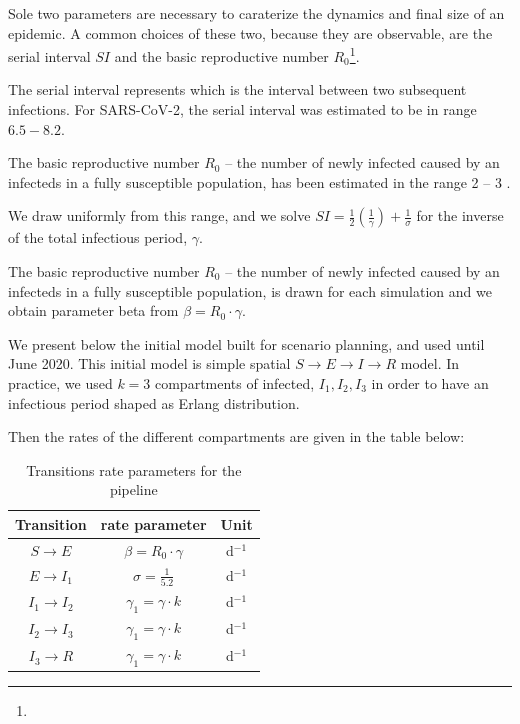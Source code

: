 Sole two parameters are necessary to caraterize the dynamics and final size of an epidemic. A common choices of these two, because they are observable, are the serial interval $SI$ and the basic reproductive number $R_0$\footnote{}.

The serial interval represents which is the interval between two subsequent infections. For SARS-CoV-2, the serial interval was estimated to be in range $6.5-8.2$\cite[][Table S4]{Bi:EpidemiologyTransmissionCOVID19:2020}. 

The basic reproductive number $R_0$ -- the number of newly infected caused by an infecteds in a fully susceptible population, has been estimated in the range 2 -- 3 \cite{Riou:PatternEarlyHumantohuman:2020}.




We draw uniformly from this range, and we solve
$SI = \frac{1}{2}(\frac{1}{\gamma})+\frac{1}{\sigma}$ for the inverse of the total infectious period, $\gamma$.

The basic reproductive number $R_0$ -- the number of newly infected caused by an infecteds in a fully susceptible population, is drawn for each simulation and we obtain parameter beta from
$\beta= R_0 \cdot \gamma$.

We present below the initial model built for scenario planning, and used until June 2020. This initial model is simple spatial $S\longrightarrow E \longrightarrow I \longrightarrow R$ model. In practice, we used $k = 3$ compartments of infected, $I_1, I_2, I_3$ in order to have an infectious period shaped as Erlang distribution.



Then the rates of the different compartments are given in the table below:
\begin{table}
    \centering
    \begin{tabular}{ccc}
\toprule
Transition & rate parameter &Unit \\
 \midrule
$S\longrightarrow E$  &   $\beta = R_0 \cdot \gamma$  & d$^{-1}$\\
$E\longrightarrow I_1$ & $\sigma = \frac{1}{5.2}$         & d$^{-1}$\\
$I_1\longrightarrow I_2$ & $\gamma_1 = \gamma \cdot k$ & d$^{-1}$\\
$I_2\longrightarrow I_3$ & $\gamma_1 = \gamma \cdot k$ & d$^{-1}$\\
$I_3\longrightarrow R$ & $\gamma_1 = \gamma \cdot k$&d$^{-1}$\\
\bottomrule
\end{tabular}
\caption{Transitions rate parameters for the pipeline}
     \label{tab:survpars}
\end{table}


